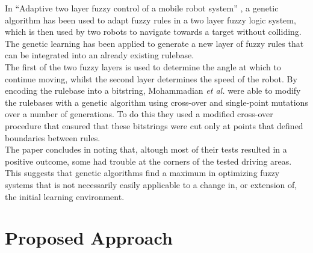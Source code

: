 \documentclass[conference]{IEEEtran}
\begin{document}
In ``Adaptive two layer fuzzy control of a mobile robot system'' \cite{mohammadian1995adaptive}, a genetic algorithm has been used to adapt fuzzy rules in a two layer fuzzy logic system, which is then used by two robots to navigate towards a target without colliding.
The genetic learning has been applied to generate a new layer of fuzzy rules that can be integrated into an already existing rulebase.\\
The first of the two fuzzy layers is used to determine the angle at which to continue moving, whilst the second layer determines the speed of the robot. By encoding the rulebase into a bitstring, Mohammadian \textit{et al.} were able to modify the rulebases with a genetic algorithm using cross-over and single-point mutations over a number of generations. To do this they used a modified cross-over procedure that ensured that these bitstrings were cut only at points that defined boundaries between rules.\\
The paper concludes in noting that, altough most of their tests resulted in a positive outcome, some had trouble at the corners of the tested driving areas. This suggests that genetic algorithms find a maximum in optimizing fuzzy systems that is not necessarily easily applicable to a change in, or extension of, the initial learning environment.

\section{Proposed Approach}
\end{document}
